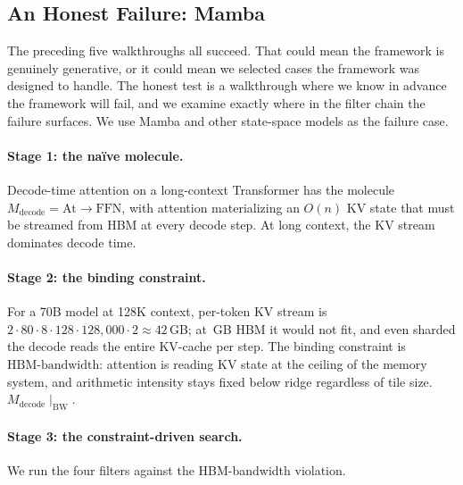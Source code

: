 \documentclass[10pt,twocolumn]{article}
\newcommand{\cvalint}[1]{\pgfmathprintnumber[fixed, precision=0, 1000 sep={\,}]{#1}}
\begin{document}
\subsection{An Honest Failure: Mamba}
\label{sec:mamba-failure}

The preceding five walkthroughs all succeed. That could mean the framework is genuinely generative, or it could mean we selected cases the framework was designed to handle. The honest test is a walkthrough where we know in advance the framework will fail, and we examine exactly where in the filter chain the failure surfaces. We use Mamba and other state-space models as the failure case.

\paragraph{Stage 1: the na\"ive molecule.} Decode-time attention on a long-context Transformer has the molecule $M_{\text{decode}} = \text{At}\rightarrow \text{FFN}$, with attention materializing an $O(n)$ KV state that must be streamed from HBM at every decode step. At long context, the KV stream dominates decode time.

\paragraph{Stage 2: the binding constraint.} For a 70B model at 128K context, per-token KV stream is $2\cdot 80\cdot 8\cdot 128\cdot 128{,}000\cdot 2 \approx 42$\,GB; at \cvalint{\HhHBMGB}\,GB HBM it would not fit, and even sharded the decode reads the entire KV-cache per step. The binding constraint is $\text{HBM-bandwidth}$: attention is reading KV state at the ceiling of the memory system, and arithmetic intensity stays fixed below ridge regardless of tile size. $M_{\text{decode}} \mid_{\text{BW}}$.

\paragraph{Stage 3: the constraint-driven search.} We run the four filters against the HBM-bandwidth violation.
\end{document}
